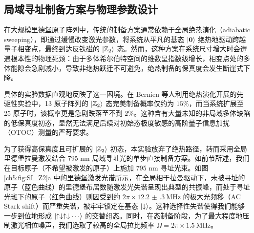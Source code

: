 \documentclass[../main.tex]{subfiles}
\begin{document}
\subsection{局域寻址制备方案与物理参数设计}

在大规模里德堡原子阵列中，传统的制备方案通常依赖于全局绝热演化（adiabatic sweeping），即通过缓慢改变激光参数，将系统从平凡的基态 $\ket{\mathbf{0}}$ 绝热地驱动跨越量子相变点，最终到达反铁磁的 $\ket{\mathbb{Z}_2}$ 态\cite{bernien2017probing,omran2019generation,bluvstein2021controlling}。然而，这种方案在系统尺寸增大时会遭遇根本性的物理死颈：由于多体希尔伯特空间的维数呈指数级增长，相变点处的多体能隙会急剧减小，导致非绝热跃迁不可避免，绝热制备的保真度会发生断崖式下降。

具体的实验数据直观地反映了这一困境。在 Bernien 等人利用绝热演化开展的先驱性实验中\cite{bernien2017probing}，13 原子阵列的 $\ket{\mathbb{Z}_2}$ 态完美制备概率仅约为 $15\%$，而当系统扩展至 25 原子时，该概率更是急剧跌落至不到 $2\%$。这种含有大量未知的非局域多体缺陷的低保真度初态，显然无法满足后续对初始态极度敏感的高阶量子信息加扰（OTOC）测量的严苛要求。




为了获得高保真度且可扩展的 $\ket{\mathbb{Z}_2}$ 初态，本实验放弃了绝热路径，转而采用全局里德堡拉曼激发结合 795 nm 局域寻址光的单步直接制备方案。如前节所述，我们在目标原子（不希望被激发的原子）上施加 795 nm 寻址光束。如图 \ref{ch5:fig:SI_Z2}a 中的里德堡激发光谱所示，在全局相干拉曼驱动下，未被寻址的原子（蓝色曲线）的里德堡布居数随激发光失谐呈现出典型的共振峰，而处于寻址光斑下的原子（红色曲线）则因受到约 $2\pi \times \SI{12.2(3)}{\MHz}$ 的极大光频移（AC Stark shift）而严重失谐，被牢牢锁定在基态 $\ket{\downarrow}$。这种选择性失谐使得我们能够一步到位地形成 $\ket{\uparrow\downarrow\uparrow\downarrow\cdots}$ 的交替组态。同时，在态制备阶段，为了最大程度地压制激光相位噪声，我们选取了较高的全局拉比频率 $\Omega = 2\pi \times \SI{1.5}{\MHz}$。
\end{document}
